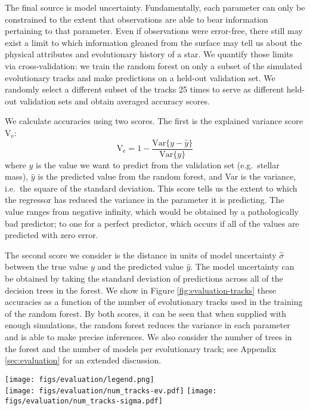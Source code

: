 \documentclass[iop,apj,twocolappendix]{emulateapj}
\begin{document}
The final source is model uncertainty. Fundamentally, each parameter can only be constrained to the extent that observations are able to bear information pertaining to that parameter. Even if observations were error-free, there still may exist a limit to which information gleaned from the surface may tell us about the physical attributes and evolutionary history of a star. We quantify those limits via cross-validation: we train the random forest on only a subset of the simulated evolutionary tracks and make predictions on a held-out validation set. We randomly select a different subset of the tracks 25 times to serve as different held-out validation sets and obtain averaged accuracy scores. 

We calculate accuracies using two scores. The first is the explained variance score V$_{\text{e}}$:
\begin{equation}
  \text{V}_{\text{e}} = 1 - \frac{\text{Var}\{ y - \hat y \}}{\text{Var}\{ y \}}
\end{equation}
where $y$ is the value we want to predict from the validation set (e.g.\ stellar mass), $\hat y$ is the predicted value from the random forest, and Var is the variance, i.e.\ the square of the standard deviation. This score tells us the extent to which the regressor has reduced the variance in the parameter it is predicting. The value ranges from negative infinity, which would be obtained by a pathologically bad predictor; to one for a perfect predictor, which occurs if all of the values are predicted with zero error. 

The second score we consider is the distance in units of model uncertainty $\hat \sigma$ between the true value $y$ and the predicted value $\hat y$. The model uncertainty can be obtained by taking the standard deviation of predictions across all of the decision trees in the forest. We show in Figure \ref{fig:evaluation-tracks} these accuracies as a function of the number of evolutionary tracks used in the training of the random forest. By both scores, it can be seen that when supplied with enough simulations, the random forest reduces the variance in each parameter and is able to make precise inferences. We also consider the number of trees in the forest and the number of models per evolutionary track; see Appendix \ref{sec:evaluation} for an extended discussion. 

\begin{figure*}
    \centering
    \texttt{[image: figs/evaluation/legend.png]}\\
    \texttt{[image: figs/evaluation/num\_tracks-ev.pdf]}\hfill
    \texttt{[image: figs/evaluation/num\_tracks-sigma.pdf]}
    \caption{Explained variance (left) and accuracy per precision score (right) of each stellar parameter as a function of the number of evolutionary tracks used in training the random forest. } 
    \label{fig:evaluation-tracks}
\end{figure*}
\end{document}
